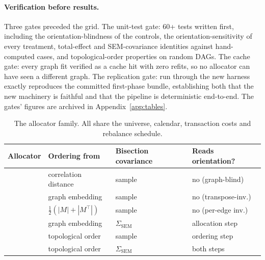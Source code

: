 \paragraph{Verification before results.} Three gates preceded the grid.
The unit-test gate: 60+ tests written first, including the
orientation-blindness of the controls, the orientation-sensitivity of every
treatment, total-effect and SEM-covariance identities against
hand-computed cases, and topological-order properties on random
DAGs. The cache gate: every graph fit verified
as a cache hit with zero refits, so no allocator can have seen a different
graph. The replication gate: \skelsamp{} run through the new
harness exactly reproduces
the committed first-phase bundle, establishing both that the new
machinery is faithful and that
the pipeline is deterministic end-to-end. The gates' figures are
archived in Appendix~\ref{app:tables}.

\begin{table}[t]
  \centering
  \caption{The allocator family. All share
    the universe, calendar, transaction costs and rebalance schedule.}
  \label{tab:variants}
  \small
  \setlength{\tabcolsep}{4.5pt}
  \begin{tabular}{l l l l}
    \toprule
    Allocator & Ordering from & Bisection covariance & Reads orientation? \\
    \midrule
    \HRP{} & correlation distance & sample & no (graph-blind) \\
    \skelsamp{}            & graph embedding      & sample & no (transpose-inv.) \\
    \skelalt{}           & $\tfrac{1}{2}(|M|{+}|M^\top|)$ & sample & no (per-edge inv.) \\
    \skelsem{}            & graph embedding      & $\Sigma_{\mathrm{SEM}}$ & allocation step \\
    \orientsamp{}            & topological order    & sample & ordering step \\
    \orientsem{}           & topological order    & $\Sigma_{\mathrm{SEM}}$ & both steps \\
    \bottomrule
  \end{tabular}
\end{table}

